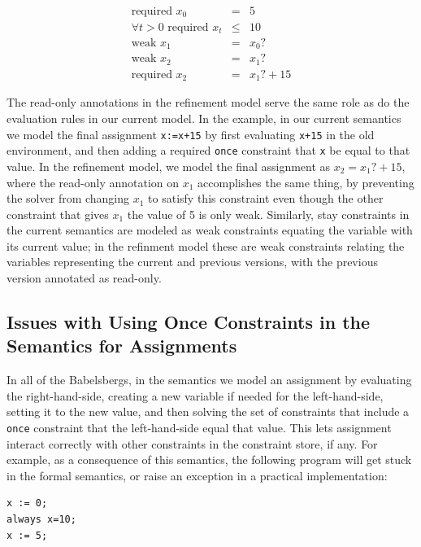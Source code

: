 \documentclass{article}
\begin{document}
\begin{eqnarray*}
\mbox{required\ \ } x_0 & = & 5            \\
\forall t>0 \mbox{\ required\ \ } x_t & \leq & 10  \\
\mbox{weak\ \ } x_1 & = & x_0?             \\
\mbox{weak\ \ } x_2 & = & x_1?             \\
\mbox{required\ \ } x_2 & = & x_1? + 15
\end{eqnarray*}

The read-only annotations in the refinement model serve the same role
as do the evaluation rules in our current model.  In the example, in
our current semantics we model the final assignment \verb|x:=x+15| by
first evaluating \verb|x+15| in the old environment, and then adding a
required \verb|once| constraint that \verb|x| be equal to that value.
In the refinement model, we model the final assignment as $x_2 = x_1?
+ 15$, where the read-only annotation on $x_1$ accomplishes the same
thing, by preventing the solver from changing $x_1$ to satisfy this
constraint even though the other constraint that gives $x_1$ the value
of 5 is only weak.  Similarly, stay constraints in the current
semantics are modeled as weak constraints equating the variable with
its current value; in the refinment model these are weak constraints
relating the variables representing the current and previous versions,
with the previous version annotated as read-only.

\subsection{Issues with Using Once Constraints in the Semantics 
  for Assignments}

In all of the Babelsbergs, in the semantics we model an assignment by
evaluating the right-hand-side, creating a new variable if needed for
the left-hand-side, setting it to the new value, and then solving the
set of constraints that include a \verb|once| constraint that the
left-hand-side equal that value.  This lets assignment interact
correctly with other constraints in the constraint store, if any.  For
example, as a consequence of this semantics, the following program
will get stuck in the formal semantics, or raise an
exception in a practical implementation:

\begin{verbatim}
x := 0;
always x=10;
x := 5;
\end{verbatim}
\end{document}
